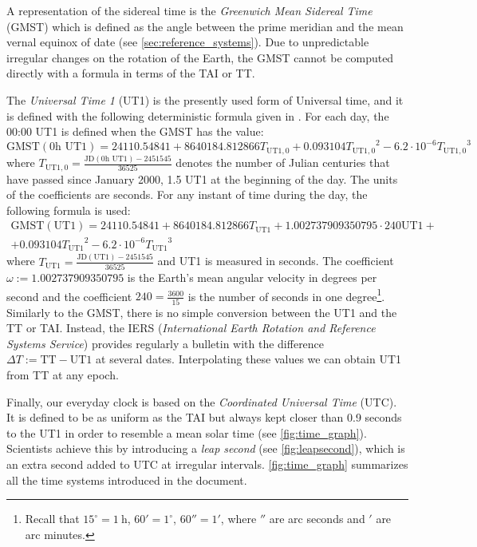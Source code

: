 \documentclass[../main.tex]{subfiles}
\begin{document}
A representation of the sidereal time is the \emph{Greenwich Mean Sidereal Time} (GMST) which is defined as the angle between the prime meridian and the mean vernal equinox of date (see \cref{sec:reference_systems}). Due to unpredictable irregular changes on the rotation of the Earth, the GMST cannot be computed directly with a formula in terms of the TAI or TT.

The \emph{Universal Time 1} (UT1) is the presently used form of Universal time, and it is defined with the following deterministic formula given in \cite{aoki}. For each day, the 00:00 UT1 is defined when the GMST has the value:
\begin{equation}
  \mathrm{GMST}(0\text{h UT1})=24110.54841+8640184.812866{T_{\text{UT1},0}}+0.093104{T_{\text{UT1},0}}^2-6.2\cdot 10^{-6}{T_{\text{UT1},0}}^3
\end{equation}
where $T_{\text{UT1},0}=\frac{\text{JD}(0\text{h UT1})-2451545}{36525}$ denotes the number of Julian centuries that have passed since January 2000, 1.5 UT1 at the beginning of the day. The units of the coefficients are seconds. For any instant of time during the day, the following formula is used:
\begin{multline}
  \mathrm{GMST}(\mathrm{UT1})=24110.54841+8640184.812866{T_{\text{UT1}}}+1.002737909350795\cdot240\text{UT1}+\\+0.093104{T_{\text{UT1}}}^2-{6.2\cdot 10^{-6}}{T_{\text{UT1}}}^3
\end{multline}
where $T_\text{UT1}=\frac{\text{JD}(\text{UT1})-2451545}{36525}$ and UT1 is measured in seconds. The coefficient $\omega:=1.002737909350795$ is the Earth's mean angular velocity in degrees per second and the coefficient $240=\frac{3600}{15}$ is the number of seconds in one degree\footnote{Recall that $15^\circ=1\ \text{h}$, $60'=1^\circ$, $60''=1'$, where $''$ are arc seconds and $'$ are arc minutes.}. Similarly to the GMST, there is no simple conversion between the UT1 and the TT or TAI. Instead, the IERS (\emph{International Earth Rotation and Reference Systems Service}) provides regularly a bulletin with the difference $\Delta T:= \mathrm{TT}-\mathrm{UT1}$ at several dates. Interpolating these values we can obtain UT1 from TT at any epoch.

Finally, our everyday clock is based on the \emph{Coordinated Universal Time} (UTC). It is defined to be as uniform as the TAI but always kept closer than 0.9 seconds to the UT1 in order to resemble a mean solar time (see \cref{fig:time_graph}). Scientists achieve this by introducing a \emph{leap second} (see \cref{fig:leapsecond}), which is an extra second added to UTC at irregular intervals. \cref{fig:time_graph} summarizes all the time systems introduced in the document.
\end{document}
